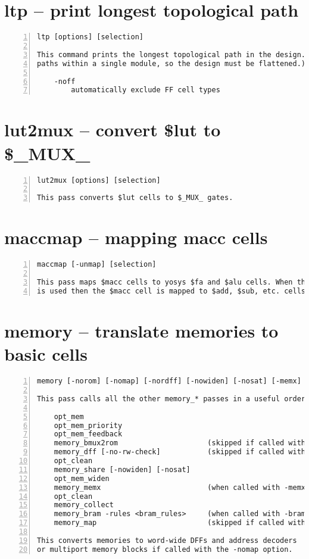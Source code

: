 \section{ltp -- print longest topological path}
\label{cmd:ltp}
\begin{lstlisting}[numbers=left,frame=single]
    ltp [options] [selection]

This command prints the longest topological path in the design. (Only considers
paths within a single module, so the design must be flattened.)

    -noff
        automatically exclude FF cell types
\end{lstlisting}

\section{lut2mux -- convert \$lut to \$\_MUX\_}
\label{cmd:lut2mux}
\begin{lstlisting}[numbers=left,frame=single]
    lut2mux [options] [selection]

This pass converts $lut cells to $_MUX_ gates.
\end{lstlisting}

\section{maccmap -- mapping macc cells}
\label{cmd:maccmap}
\begin{lstlisting}[numbers=left,frame=single]
    maccmap [-unmap] [selection]

This pass maps $macc cells to yosys $fa and $alu cells. When the -unmap option
is used then the $macc cell is mapped to $add, $sub, etc. cells instead.
\end{lstlisting}

\section{memory -- translate memories to basic cells}
\label{cmd:memory}
\begin{lstlisting}[numbers=left,frame=single]
    memory [-norom] [-nomap] [-nordff] [-nowiden] [-nosat] [-memx] [-no-rw-check] [-bram <bram_rules>] [selection]

This pass calls all the other memory_* passes in a useful order:

    opt_mem
    opt_mem_priority
    opt_mem_feedback
    memory_bmux2rom                     (skipped if called with -norom)
    memory_dff [-no-rw-check]           (skipped if called with -nordff or -memx)
    opt_clean
    memory_share [-nowiden] [-nosat]
    opt_mem_widen
    memory_memx                         (when called with -memx)
    opt_clean
    memory_collect
    memory_bram -rules <bram_rules>     (when called with -bram)
    memory_map                          (skipped if called with -nomap)

This converts memories to word-wide DFFs and address decoders
or multiport memory blocks if called with the -nomap option.
\end{lstlisting}

